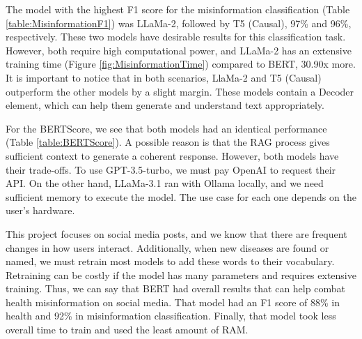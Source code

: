 The model with the highest F1 score for the misinformation classification (Table \ref{table:MisinformationF1}) was LLaMa-2, followed by T5 (Causal), 97\% and 96\%, respectively. These two models
have desirable results for this classification task. However, both require high computational power, and LLaMa-2 has an extensive training time (Figure \ref{fig:MisinformationTime}) compared to BERT,
30.90x more. It is important to notice that in both scenarios, LlaMa-2 and T5 (Causal) outperform the other models by a slight margin. These models contain a Decoder element, which can help them
generate and understand text appropriately.

For the BERTScore, we see that both models had an identical performance (Table \ref{table:BERTScore}). A possible reason is that the RAG process gives sufficient context to generate a coherent response. However, both models
have their trade-offs. To use GPT-3.5-turbo, we must pay OpenAI to request their API. On the other hand, LLaMa-3.1 ran with Ollama locally, and we need sufficient memory to execute the model. The
use case for each one depends on the user's hardware.

This project focuses on social media posts, and we know that there are frequent changes in how users interact. Additionally, when new diseases are found or named, we must retrain most
models to add these words to their vocabulary. Retraining can be costly if the model has many parameters and requires extensive training. Thus, we can say that BERT had overall results
that can help combat health misinformation on social media. That model had an F1 score of 88\% in health and 92\% in misinformation classification. Finally, that model took less overall time
to train and used the least amount of RAM.




